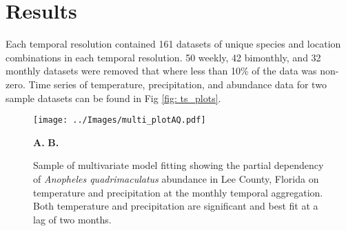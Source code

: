 \section{Results}

Each temporal resolution contained 161 datasets of unique species and location combinations in each temporal resolution. 50 weekly, 42 bimonthly, and 32 monthly datasets were removed that where less than 10\% of the data was non-zero. Time series of temperature, precipitation, and abundance data for two sample datasets can be found in Fig \ref{fig: ts_plots}. 


\begin{figure}[h!]
	\begin{minipage}[]{\textwidth}
		\centering
		\texttt{[image: ../Images/multi\_plotAQ.pdf]}
	\end{minipage}
	\begin{minipage}[]{\textwidth}
		\vspace{.3cm}
		\hspace{5.2cm}\textbf{A.}
		\hspace{7cm}\textbf{B.}
	\end{minipage}
	\caption{Sample of multivariate model fitting  showing the partial dependency of \textit{Anopheles quadrimaculatus} abundance in Lee County, Florida on temperature and precipitation at the monthly temporal aggregation. Both temperature and precipitation are significant and best fit at a lag of two months.}
	\label{fig: multivar}
\end{figure}

